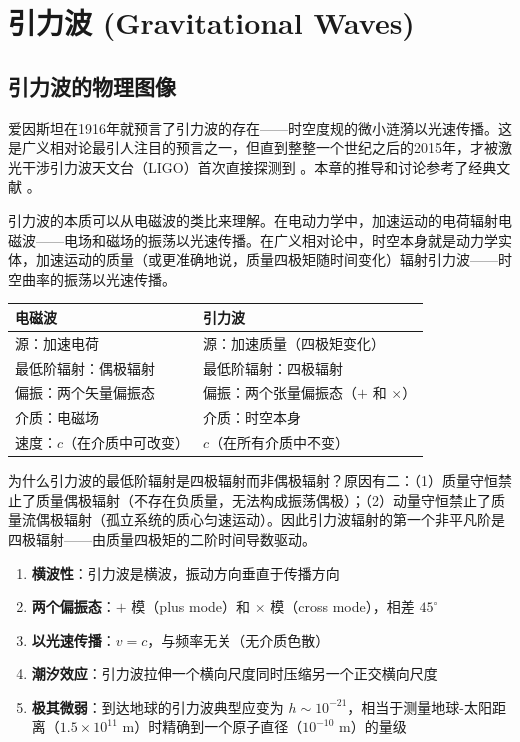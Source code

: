 \chapter{引力波 (Gravitational Waves)}
\label{chap:GW}

\section{引力波的物理图像}
\label{sec:GW_physical_picture}

爱因斯坦在1916年就预言了引力波的存在——时空度规的微小涟漪以光速传播。这是广义相对论最引人注目的预言之一，但直到整整一个世纪之后的2015年，才被激光干涉引力波天文台（LIGO）首次直接探测到 \cite{Abbott2016}。本章的推导和讨论参考了经典文献 \cite{Carroll1997,Misner1973,Wald1984}。

引力波的本质可以从电磁波的类比来理解。在电动力学中，加速运动的电荷辐射电磁波——电场和磁场的振荡以光速传播。在广义相对论中，时空本身就是动力学实体，加速运动的质量（或更准确地说，质量四极矩随时间变化）辐射引力波——时空曲率的振荡以光速传播。

\begin{note}[引力波与电磁波的对比]
\begin{center}
\begin{tabular}{l|l}
\hline
\textbf{电磁波} & \textbf{引力波} \\ \hline
源：加速电荷 & 源：加速质量（四极矩变化） \\
最低阶辐射：偶极辐射 & 最低阶辐射：四极辐射 \\
偏振：两个矢量偏振态 & 偏振：两个张量偏振态（$+$ 和 $\times$） \\
介质：电磁场 & 介质：时空本身 \\
速度：$c$（在介质中可改变） & $c$（在所有介质中不变） \\
\hline
\end{tabular}
\end{center}
\end{note}

为什么引力波的最低阶辐射是四极辐射而非偶极辐射？原因有二：（1）质量守恒禁止了质量偶极辐射（不存在负质量，无法构成振荡偶极）；（2）动量守恒禁止了质量流偶极辐射（孤立系统的质心匀速运动）。因此引力波辐射的第一个非平凡阶是四极辐射——由质量四极矩的二阶时间导数驱动。

\begin{property}[引力波的基本特征]
\begin{enumerate}
    \item \textbf{横波性}：引力波是横波，振动方向垂直于传播方向
    \item \textbf{两个偏振态}：$+$ 模（plus mode）和 $\times$ 模（cross mode），相差 $45^\circ$
    \item \textbf{以光速传播}：$v = c$，与频率无关（无介质色散）
    \item \textbf{潮汐效应}：引力波拉伸一个横向尺度同时压缩另一个正交横向尺度
    \item \textbf{极其微弱}：到达地球的引力波典型应变为 $h \sim 10^{-21}$，相当于测量地球-太阳距离（$1.5\times10^{11}$ m）时精确到一个原子直径（$10^{-10}$ m）的量级
\end{enumerate}
\end{property}

